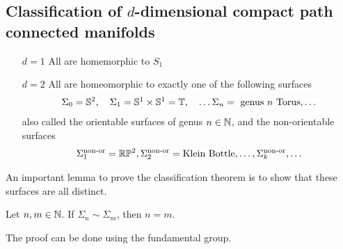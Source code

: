 \subsection*{Classification of $d$-dimensional compact path connected manifolds}
\begin{itemize}
  \item[$d=1$] All are homemorphic to $S_1$
  \item[$d=2$] All are homeomorphic to exactly one of the following surfaces
    \begin{align*}
      \Sigma_0 = \mathbb{S}^{2}, \quad \Sigma_1 = \mathbb{S}^{1} \times \mathbb{S}^{1} = \mathbb{T}, \quad \ldots \Sigma_n = \text{ genus $n$ Torus}, \ldots
    \end{align*}
    also called the orientable surfaces of genus $n \in \mathbb{N}$,
    and the non-orientable surfaces
    \begin{align*}
      \Sigma_1^{\text{non-or}} = \mathbb{R}\mathbb{P}^{2}, \Sigma_2^{\text{non-or}} = \text{Klein Bottle}, \ldots,\Sigma_k^{\text{non-or}},\ldots
    \end{align*}
\end{itemize}
An important lemma to prove the classification theorem is to show that these surfaces are all distinct.
\begin{lem}[]
Let $n,m \in \mathbb{N}$. If $\Sigma_n \sim \Sigma_m$, then $n=m$.
\end{lem}
The proof can be done using the fundamental group.
